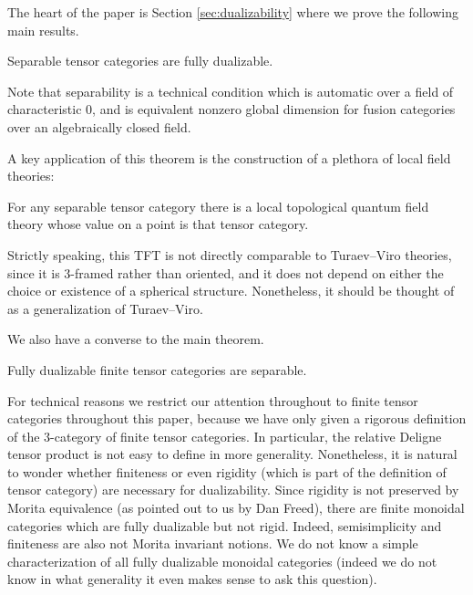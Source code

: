 \documentclass{amsart}
\begin{document}
The heart of the paper is Section \ref{sec:dualizability} where we prove the following main results.


\begin{maintheorem} \label{thm1}
Separable tensor categories are fully dualizable.
\end{maintheorem}

\nid Note that separability is a technical condition which is automatic over a field of characteristic $0$, and is equivalent nonzero global dimension for fusion categories over an algebraically closed field.

A key application of this theorem is the construction of a plethora of local field theories:
\begin{maincor} \label{cor2}
For any separable tensor category there is a local topological quantum field theory whose value on a point is that tensor category.
\end{maincor}

\nid Strictly speaking, this TFT is not directly comparable to Turaev--Viro theories, since it is $3$-framed rather than oriented, and it does not depend on either the choice or existence of a spherical structure.  Nonetheless, it should be thought of as a generalization of Turaev--Viro.

We also have a converse to the main theorem.

\begin{maintheorem} \label{thm3}
Fully dualizable finite tensor categories are separable.
\end{maintheorem}

For technical reasons we restrict our attention throughout to finite tensor categories throughout this paper, because we have only given a rigorous definition of the $3$-category of finite tensor categories.  In particular, the relative Deligne tensor product is not easy to define in more generality.  Nonetheless, it is natural to wonder whether finiteness or even rigidity (which is part of the definition of tensor category) are necessary for dualizability.  Since rigidity is not preserved by Morita equivalence (as pointed out to us by Dan Freed), there are finite monoidal categories which are fully dualizable but not rigid.  Indeed, semisimplicity and finiteness are also not Morita invariant notions.  We do not know a simple characterization of all fully dualizable monoidal categories (indeed we do not know in what generality it even makes sense to ask this question).
\end{document}
